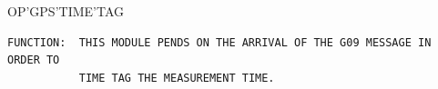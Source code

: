 \begin{frame}
OP'GPS'TIME'TAG
\begin{verbatim}
FUNCTION:  THIS MODULE PENDS ON THE ARRIVAL OF THE G09 MESSAGE IN ORDER TO 
           TIME TAG THE MEASUREMENT TIME.
\end{verbatim}
\end{frame}
